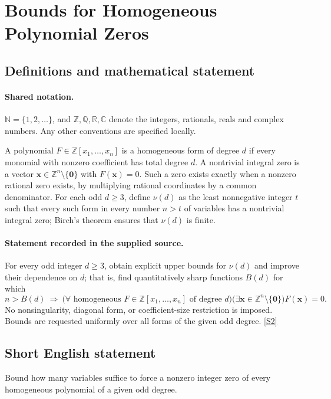 \documentclass[11pt]{article}
\newcommand{\sref}[2]{\hyperlink{source:#1:#2}{[S#2]}}
\begin{document}
\section{Bounds for Homogeneous Polynomial Zeros}\label{statement}

\subsection{Definitions and mathematical statement}

\paragraph{Shared notation.}$\mathbb N=\{1,2,\ldots\}$, and $\mathbb Z,\mathbb Q,\mathbb R,\mathbb C$ denote the integers, rationals, reals and complex numbers. Any other conventions are specified locally.


A polynomial $F\in\mathbb Z[x_1,\ldots,x_n]$ is a homogeneous form of degree $d$ if every monomial with nonzero coefficient has total degree $d$. A nontrivial integral zero is a vector $\mathbf x\in\mathbb Z^n\setminus\{\mathbf0\}$ with $F(\mathbf x)=0$. Such a zero exists exactly when a nonzero rational zero exists, by multiplying rational coordinates by a common denominator. For each odd $d\geq3$, define $\nu(d)$ as the least nonnegative integer $t$ such that every such form in every number $n>t$ of variables has a nontrivial integral zero; Birch's theorem ensures that $\nu(d)$ is finite.
\paragraph{Statement recorded in the supplied source.}
For every odd integer $d\geq3$, obtain explicit upper bounds for $\nu(d)$ and improve their dependence on $d$; that is, find quantitatively sharp functions $B(d)$ for which
\[
 n>B(d)\ \Longrightarrow\
 \bigl(\forall\text{ homogeneous }F\in\mathbb Z[x_1,\ldots,x_n]
 \text{ of degree }d\bigr)
 \bigl(\exists\mathbf x\in\mathbb Z^n\setminus\{\mathbf0\}\bigr)
 F(\mathbf x)=0.
\]
No nonsingularity, diagonal form, or coefficient-size restriction is imposed. Bounds are requested uniformly over all forms of the given odd degree. \sref{statement}{2}
\subsection{Short English statement}
Bound how many variables suffice to force a nonzero integer zero of every homogeneous polynomial of a given odd degree.
\end{document}
